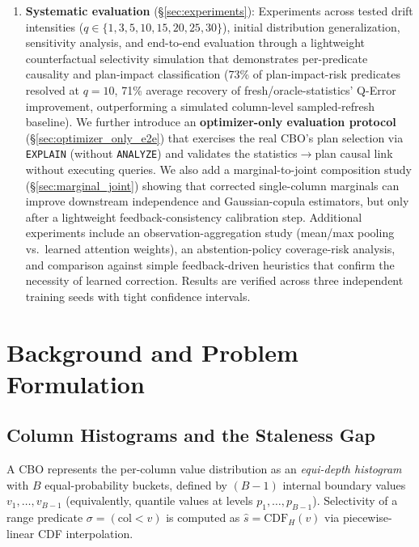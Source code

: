 \documentclass[runningheads]{llncs}
\begin{document}
\begin{enumerate}
  \item \textbf{Systematic evaluation} (\S\ref{sec:experiments}):
        Experiments across tested drift intensities
        ($q\in\{1,3,5,10,15,20,25,30\}$), initial distribution generalization,
        sensitivity analysis, and end-to-end evaluation through a
        lightweight counterfactual selectivity simulation that demonstrates
        per-predicate causality and plan-impact classification (73\%
        of plan-impact-risk predicates resolved at $q{=}10$, 71\% average recovery of
        fresh/oracle-statistics' Q-Error improvement, outperforming a simulated
        column-level sampled-refresh baseline).
        We further introduce an \textbf{optimizer-only evaluation protocol}
        (\S\ref{sec:optimizer_only_e2e}) that exercises the real CBO's plan
        selection via \texttt{EXPLAIN} (without \texttt{ANALYZE}) and
        validates the statistics$\rightarrow$plan causal link without
        executing queries.
        We also add a marginal-to-joint composition study
        (\S\ref{sec:marginal_joint}) showing that corrected single-column
        marginals can improve downstream independence and Gaussian-copula
        estimators, but only after a lightweight feedback-consistency
        calibration step.
        Additional experiments include an observation-aggregation study (mean/max
        pooling vs.\ learned attention weights), an abstention-policy
        coverage-risk analysis,
        and comparison against simple feedback-driven heuristics that confirm
        the necessity of learned correction.
        Results are verified across three independent training seeds with
        tight confidence intervals.
\end{enumerate}



\section{Background and Problem Formulation}
\label{sec:background}
\subsection{Column Histograms and the Staleness Gap}

A CBO represents the per-column value distribution as an \emph{equi-depth
histogram} with $B$ equal-probability buckets, defined by $(B-1)$ internal
boundary values $v_1,\ldots,v_{B-1}$ (equivalently, quantile values at levels
$p_1,\ldots,p_{B-1}$).
Selectivity of a range predicate $\sigma=(\text{col} < v)$ is computed as
$\hat{s} = \mathrm{CDF}_{H}(v)$ via piecewise-linear CDF interpolation.
\end{document}
